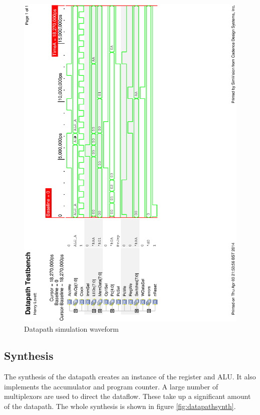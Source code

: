 \begin{figure}
\includegraphics[height=\textheight-1cm]{Figures/datapathsim.eps}
\caption{Datapath simulation waveform}
\label{fig:datapathsim}
\end{figure}

\subsection{Synthesis}

The synthesis of the datapath creates an instance of the register and ALU. 
It also implements the accumulator and program counter. 
A large number of multiplexors are used to direct the dataflow.%
These take up a significant amount of the datapath. 
The whole synthesis is shown in figure \ref{fig:datapathsynth}.



